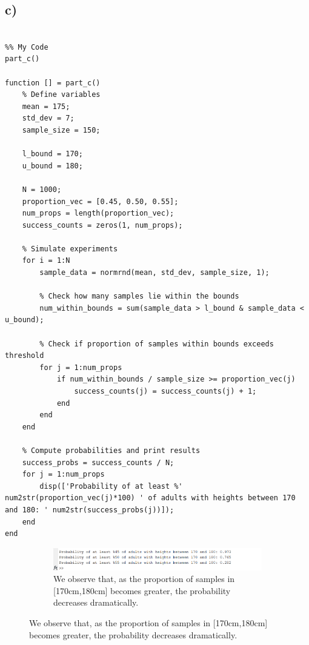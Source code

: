 \documentclass[12pt]{article}
\begin{document}
\subsection*{c)} 
\begin{lstlisting}[style=Matlab-editor]

%% My Code
part_c()

function [] = part_c()
    % Define variables
    mean = 175;
    std_dev = 7;
    sample_size = 150;
    
    l_bound = 170;
    u_bound = 180;
    
    N = 1000;
    proportion_vec = [0.45, 0.50, 0.55];
    num_props = length(proportion_vec);
    success_counts = zeros(1, num_props);
    
    % Simulate experiments
    for i = 1:N
        sample_data = normrnd(mean, std_dev, sample_size, 1);
        
        % Check how many samples lie within the bounds
        num_within_bounds = sum(sample_data > l_bound & sample_data < u_bound);
        
        % Check if proportion of samples within bounds exceeds threshold
        for j = 1:num_props
            if num_within_bounds / sample_size >= proportion_vec(j)
                success_counts(j) = success_counts(j) + 1;
            end
        end
    end
    
    % Compute probabilities and print results
    success_probs = success_counts / N;
    for j = 1:num_props
        disp(['Probability of at least %' num2str(proportion_vec(j)*100) ' of adults with heights between 170 and 180: ' num2str(success_probs(j))]);
    end
end
\end{lstlisting}


\begin{figure}[H]
  \centering
  \begin{subfigure}[b]{0.4\linewidth}
    \includegraphics[width=\linewidth]{Screenshot (1461).png}
    \caption{We observe that, as the proportion of samples in [170cm,180cm] becomes greater, the probability decreases dramatically.}
  \end{subfigure}
\end{figure}
\end{document}
